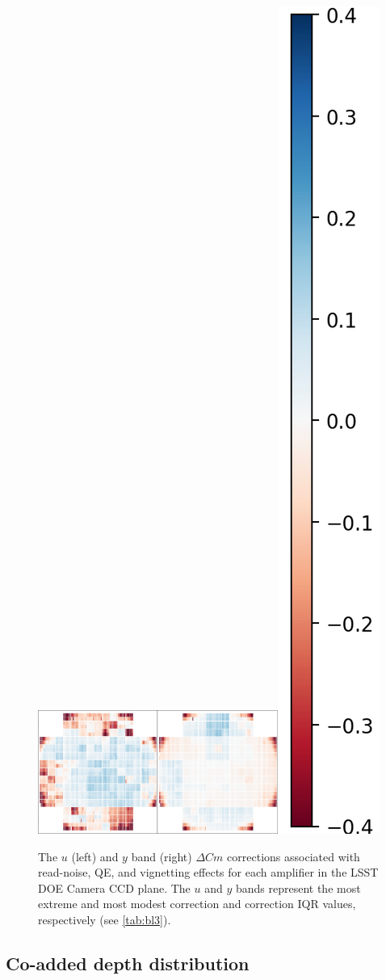 \documentclass[PST,authoryear,toc]{lsstdoc}
\begin{document}
\FloatBarrier
 \FloatBarrier


\begin{figure}[!hb]
    \centering

    \includegraphics[width=0.35\textwidth]{figures/ccdplaneU}\includegraphics[width=0.35\textwidth]{figures/ccdplaneY}\includegraphics[height=0.36\textwidth]{figures/colorbar.png}
\caption{The $u$ (left) and $y$ band (right) $\Delta Cm$ corrections associated with read-noise, QE, and vignetting effects for each amplifier in the LSST DOE Camera CCD plane. The $u$ and $y$ bands represent the most extreme and most modest correction and correction IQR values, respectively (see \autoref{tab:bl3}).}\label{fig:ccdplane}
\end{figure}
 \FloatBarrier





\subsection{Co-added depth distribution}\label{sec:coadd}
\end{document}

